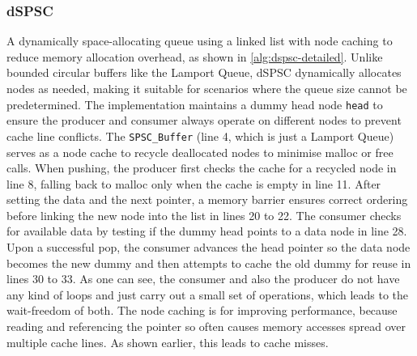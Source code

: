 \subsubsection{\acf{dSPSC}}
A dynamically space-allocating queue using a linked list with node caching to reduce memory allocation overhead, as shown in \cref{alg:dspsc-detailed}. Unlike bounded circular buffers like the Lamport Queue, dSPSC dynamically allocates nodes as needed, making it suitable for scenarios where the queue size cannot be predetermined. The implementation maintains a dummy head node \texttt{head} to ensure the producer and consumer always operate on different nodes to prevent cache line conflicts. The \texttt{SPSC\_Buffer} (line 4, which is just a Lamport Queue) serves as a node cache to recycle deallocated nodes to minimise malloc or free calls. When pushing, the producer first checks the cache for a recycled node in line 8, falling back to malloc only when the cache is empty in line 11. After setting the data and the next pointer, a memory barrier ensures correct ordering before linking the new node into the list in lines 20 to 22. The consumer checks for available data by testing if the dummy head points to a data node in line 28. Upon a successful pop, the consumer advances the head pointer so the data node becomes the new dummy and then attempts to cache the old dummy for reuse in lines 30 to 33. As one can see, the consumer and also the producer do not have any kind of loops and just carry out a small set of operations, which leads to the wait-freedom of both. The node caching is for improving performance, because reading and referencing the pointer so often causes memory accesses spread over multiple cache lines. As shown earlier, this leads to cache misses. \cite{torquati2010singleproducersingleconsumerqueuessharedcache}

